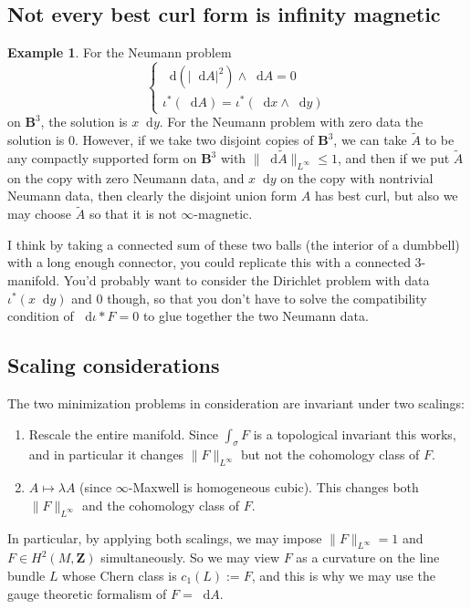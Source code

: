 \documentclass[reqno,11pt]{amsart}
\newcommand{\ZZ}{\mathbf{Z}}
\newcommand{\Ball}{\mathbf{B}}
\newcommand*\dif{\mathop{}\!\mathrm{d}}
\theoremstyle{definition}
\newtheorem{example}[theorem]{Example}
\numberwithin{equation}{section}
\begin{document}
\subsection{Not every best curl form is infinity magnetic}
\begin{example}
For the Neumann problem 
$$\begin{cases}
\dif(|\dif A|^2) \wedge \dif A = 0 \\
\iota^*(\dif A) = \iota^*(\dif x \wedge \dif y)
\end{cases}$$
on $\Ball^3$, the solution is $x \dif y$. For the Neumann problem with zero data the solution is $0$.
However, if we take two disjoint copies of $\Ball^3$, we can take $\tilde A$ to be any compactly supported form on $\Ball^3$ with $\|\dif \tilde A\|_{L^\infty} \leq 1$, and then if we put $\tilde A$ on the copy with zero Neumann data, and $x \dif y$ on the copy with nontrivial Neumann data, then clearly the disjoint union form $A$ has best curl, but also we may choose $\tilde A$ so that it is not $\infty$-magnetic.

I think by taking a connected sum of these two balls (the interior of a dumbbell) with a long enough connector, you could replicate this with a connected $3$-manifold.
You'd probably want to consider the Dirichlet problem with data $\iota^*(x \dif y)$ and $0$ though, so that you don't have to solve the compatibility condition of $\dif \iota* F = 0$ to glue together the two Neumann data.
\end{example}


\subsection{Scaling considerations}
The two minimization problems in consideration are invariant under two scalings: 
\begin{enumerate}
\item Rescale the entire manifold. Since $\int_\sigma F$ is a topological invariant this works, and in particular it changes $\|F\|_{L^\infty}$ but not the cohomology class of $F$.
\item $A \mapsto \lambda A$ (since $\infty$-Maxwell is homogeneous cubic). This changes both $\|F\|_{L^\infty}$ and the cohomology class of $F$.
\end{enumerate}
In particular, by applying both scalings, we may impose $\|F\|_{L^\infty} = 1$ and $F \in H^2(M, \ZZ)$ simultaneously.
So we may view $F$ as a curvature on the line bundle $L$ whose Chern class is $c_1(L) := F$, and this is why we may use the gauge theoretic formalism of $F = \dif A$.
\end{document}
